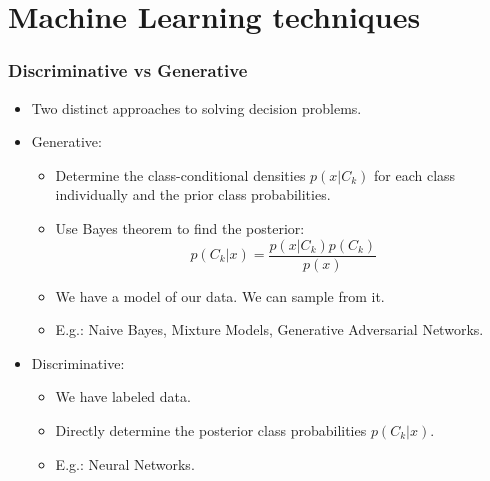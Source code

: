 \documentclass{beamer}
\begin{document}
\section{Machine Learning techniques}
\begin{frame}
\frametitle{Discriminative vs Generative}
\begin{itemize}
\item Two distinct approaches to solving decision problems.
\item Generative:
\begin{itemize}
\item Determine the class-conditional densities \(p(x|C_k) \) for each class individually
and the prior class probabilities.
\item Use Bayes theorem to find the posterior:
\[
p(C_k|x) = \frac{p(x|C_k)p(C_k)}{p(x)}
\]
\item We have a model of our data. We can sample from it.
\item E.g.: Naive Bayes, Mixture Models, Generative Adversarial Networks.
\end{itemize}
\item Discriminative:
\begin{itemize}
	\item We have labeled data.
	\item Directly determine the posterior class probabilities \(p(C_k|x)\).
	\item E.g.: Neural Networks.
\end{itemize}
	
\end{itemize}

\end{frame}
\end{document}
